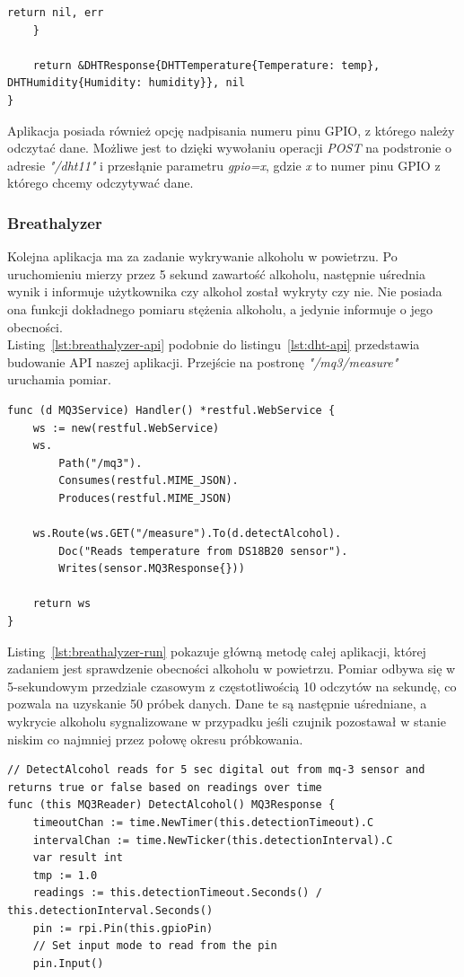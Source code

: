 \documentclass[12pt]{report}
\let\Oldsubsubsection\subsubsection
\renewcommand{\subsubsection}{\FloatBarrier\Oldsubsubsection}
\begin{document}
{\begin{lstlisting}[language=golang,caption=Odczyt danych z sensora DHT11,label=lst:dht-read]
		return nil, err
	}

	return &DHTResponse{DHTTemperature{Temperature: temp}, DHTHumidity{Humidity: humidity}}, nil
}
\end{lstlisting}

\noindent Aplikacja posiada również opcję nadpisania numeru pinu GPIO, z którego należy odczytać dane. Możliwe jest to dzięki wywołaniu operacji \textit{POST} na podstronie o adresie \textit{"/dht11"} i przesłąnie parametru \textit{gpio=x}, gdzie \textit{x} to numer pinu GPIO z którego chcemy odczytywać dane.

\subsubsection{Breathalyzer}
Kolejna aplikacja ma za zadanie wykrywanie alkoholu w powietrzu. Po uruchomieniu mierzy przez 5 sekund zawartość alkoholu, następnie uśrednia wynik i informuje użytkownika czy alkohol został wykryty czy nie. Nie posiada ona funkcji dokładnego pomiaru stężenia alkoholu, a jedynie informuje o jego obecności. \\

\noindent Listing~\ref{lst:breathalyzer-api} podobnie do listingu~\ref{lst:dht-api} przedstawia budowanie API naszej aplikacji. Przejście na postronę \textit{"/mq3/measure"} uruchamia pomiar.
\begin{lstlisting}[language=golang,caption=Konfiguracja API,label=lst:breathalyzer-api]
func (d MQ3Service) Handler() *restful.WebService {
	ws := new(restful.WebService)
	ws.
		Path("/mq3").
		Consumes(restful.MIME_JSON).
		Produces(restful.MIME_JSON)

	ws.Route(ws.GET("/measure").To(d.detectAlcohol).
		Doc("Reads temperature from DS18B20 sensor").
		Writes(sensor.MQ3Response{}))

	return ws
}
\end{lstlisting}

\noindent Listing~\ref{lst:breathalyzer-run} pokazuje główną metodę całej aplikacji, której zadaniem jest sprawdzenie obecności alkoholu w powietrzu. Pomiar odbywa się w 5-sekundowym przedziale czasowym z częstotliwością 10 odczytów na sekundę, co pozwala na uzyskanie 50 próbek danych. Dane te są następnie uśredniane, a wykrycie alkoholu sygnalizowane w przypadku jeśli czujnik pozostawał w stanie niskim co najmniej przez połowę okresu próbkowania.
\begin{lstlisting}[language=golang,caption=Pomiar alkoholu w powietrzu,label=lst:breathalyzer-run]
// DetectAlcohol reads for 5 sec digital out from mq-3 sensor and returns true or false based on readings over time
func (this MQ3Reader) DetectAlcohol() MQ3Response {
	timeoutChan := time.NewTimer(this.detectionTimeout).C
	intervalChan := time.NewTicker(this.detectionInterval).C
	var result int
	tmp := 1.0
	readings := this.detectionTimeout.Seconds() / this.detectionInterval.Seconds()
	pin := rpi.Pin(this.gpioPin)
	// Set input mode to read from the pin
	pin.Input()


\end{lstlisting}}
\end{document}
